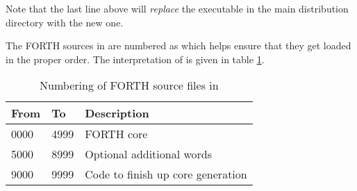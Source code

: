 \documentclass{article}
\begin{document}
Note that the last line above will \textit{replace} the 
executable in the main distribution directory with the new one.

The FORTH sources in  are numbered as 
which helps ensure that they get loaded in the proper order. The
interpretation of  is given in table \ref{t:nnnn}.
\begin{table}
\begin{center}
\begin{tabular}{|l|l|l|} \hline
\textbf{From} & \textbf{To} & \textbf{Description} \\ \hline
0000 & 4999 & FORTH core \\ \hline
5000 & 8999 & Optional additional words \\ \hline
9000 & 9999 & Code to finish up core generation \\ \hline
\end{tabular}
\end{center}
\caption{Numbering of FORTH source files in }
\label{t:nnnn}
\end{table}
\end{document}
